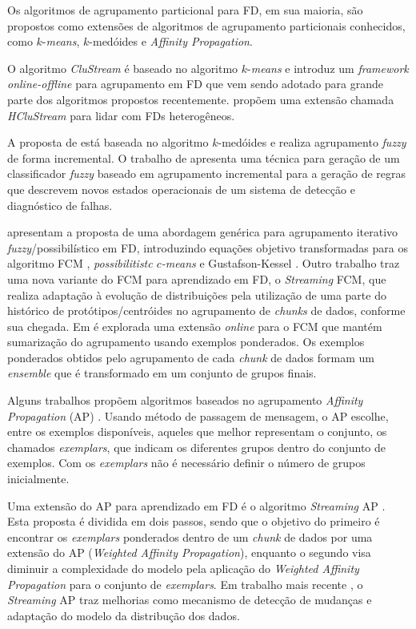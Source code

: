 Os algoritmos de agrupamento particional para FD, em sua maioria, são propostos como extensões de algoritmos de agrupamento particionais conhecidos, como $k$-\emph{means}, $k$-medóides e \emph{Affinity Propagation}.

O algoritmo \emph{CluStream} \cite{Aggarwal2003} é baseado no algoritmo $k$-\emph{means} e introduz um \emph{framework} \emph{online-offline} para agrupamento em FD que vem sendo adotado para grande parte dos algoritmos propostos recentemente.  propõem uma extensão chamada \emph{HCluStream} para lidar com FDs heterogêneos.

A proposta de  está baseada no algoritmo $k$-medóides e realiza agrupamento \emph{fuzzy} de forma incremental. O trabalho de  apresenta uma técnica para geração de um classificador \emph{fuzzy} baseado em agrupamento incremental para a geração de regras que descrevem novos estados operacionais de um sistema de detecção e diagnóstico de falhas.

 apresentam a proposta de uma abordagem genérica para agrupamento iterativo \emph{fuzzy}/possibilístico em FD, introduzindo equações objetivo transformadas para os algoritmo FCM \cite{Bezdek1981}, \emph{possibilitistc $c$-means} \cite{Krishnapuram1996} e Gustafson-Kessel \cite{Gustafson1978}. Outro trabalho \cite{Hore2007a} traz uma nova variante do FCM para aprendizado em FD, o \emph{Streaming} FCM, que realiza adaptação à evolução de distribuições pela utilização de uma parte do histórico de protótipos/centróides no agrupamento de \emph{chunks} de dados, conforme sua chegada. Em \cite{Hore2008} é explorada uma extensão \emph{online} para o FCM que mantém sumarização do agrupamento usando exemplos ponderados. Os exemplos ponderados obtidos pelo agrupamento de cada \emph{chunk} de dados formam um \emph{ensemble} que é transformado em um conjunto de grupos finais.

Alguns trabalhos propõem algoritmos baseados no agrupamento \emph{Affinity Propagation} (AP) \cite{Frey2007}. Usando método de passagem de mensagem, o AP escolhe, entre os exemplos disponíveis, aqueles que melhor representam o conjunto, os chamados \emph{exemplars}, que indicam os diferentes grupos dentro do conjunto de exemplos. Com os \emph{exemplars} não é necessário definir o número de grupos inicialmente.

Uma extensão do AP  para aprendizado em FD é o algoritmo \emph{Streaming} AP \cite{Zhang2008}. Esta proposta é dividida em dois passos, sendo que o objetivo do primeiro é encontrar os \emph{exemplars} ponderados dentro de um \emph{chunk} de dados por uma extensão do AP (\emph{Weighted Affinity Propagation}), enquanto o segundo visa diminuir a complexidade do modelo pela aplicação do \emph{Weighted Affinity Propagation} para o conjunto de \emph{exemplars}. Em trabalho mais recente \cite{Zhang2014}, o \emph{Streaming} AP traz melhorias como mecanismo de detecção de mudanças e adaptação do modelo da distribução dos dados.  

